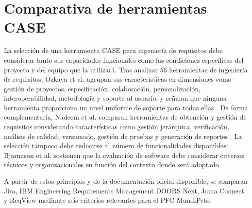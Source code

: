 \documentclass[journal,onecolumn]{IEEEtran}
\begin{document}
	\section{Comparativa de herramientas CASE}
	
	La selección de una herramienta CASE para ingeniería de requisitos debe considerar tanto sus capacidades funcionales como las condiciones específicas del proyecto y del equipo que la utilizará. Tras analizar 56 herramientas de ingeniería de requisitos, Ozkaya et al. agrupan sus características en dimensiones como gestión de proyectos, especificación, colaboración, personalización, interoperabilidad, metodología y soporte al usuario, y señalan que ninguna herramienta proporciona un nivel uniforme de soporte para todas ellas \cite{Ozkaya2023}. De forma complementaria, Nadeem et al. comparan herramientas de obtención y gestión de requisitos considerando características como gestión jerárquica, verificación, análisis de calidad, versionado, gestión de pruebas y generación de reportes \cite{Nadeem2022}. La selección tampoco debe reducirse al número de funcionalidades disponibles: Bjarnason et al. sostienen que la evaluación de software debe considerar criterios técnicos y organizacionales en función del contexto donde será adoptado \cite{Bjarnason2023}.
	
	A partir de estos principios y de la documentación oficial disponible, se comparan Jira, IBM Engineering Requirements Management DOORS Next, Jama Connect y ReqView mediante seis criterios relevantes para el PFC MundiPets.
	
\end{document}
